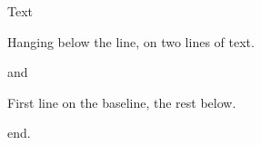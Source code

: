 \documentclass{article}
\begin{document}
\noindent Text \parbox[t]{3cm}{\vspace{0pt}Hanging below the line, on two lines of text.} and \parbox[t]{3cm}{First line on the baseline, the rest below.} end.
\end{document}

